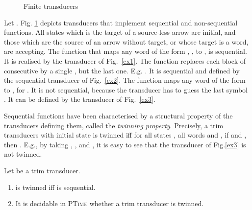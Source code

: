 \documentclass[envcountsame]{llncs}
\newcommand\trans[2]{\ensuremath{#1\mid #2}}
\begin{document}
\begin{figure}[t]
{
}
\vspace{-4mm}
\caption{Finite transducers}
\label{fig:transducers} 
\vspace{-6mm}
\end{figure}


Let . Fig. \ref{fig:transducers} depicts transducers 
that implement sequential and non-sequential functions. All states
which is the target of a source-less arrow are initial, and those
which are the source of an arrow without target, or whose target is a
word, are accepting.  The function  that maps any word of the
form , , to , is sequential. It is realised by the
transducer of Fig.~\ref{ex1}. The function  replaces each
block of consecutive  by a single , but the last
one. E.g. . It is sequential and defined by
the sequential transducer of Fig.~\ref{ex2}. The function 
maps any word of the form  to , for
. It is not sequential, because the transducer
has to guess the last symbol . It can be defined by the
transducer of Fig.~\ref{ex3}. 



Sequential functions have been characterised by a structural property
of the transducers defining them, called the \emph{twinning
  property}.  Precisely, a trim transducers with initial state 
is twinned iff for all states , all words  and
, if  and , then . E.g., by taking , ,  and , it is easy to see that 
the transducer of Fig.\ref{ex3} is not twinned.


\begin{theorem}
Let  be a trim transducer.
\vspace{-2mm}
\begin{enumerate}
    \item  is twinned iff  is sequential. 
    \item It is decidable in \textsc{PTime} whether a trim transducer
      is twinned. 
\end{enumerate}
\end{theorem}
\end{document}
